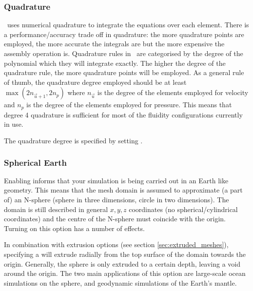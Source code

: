 \subsubsection{Quadrature}
\fluidity\ uses numerical quadrature to integrate the equations over each
element. There is a performance/accuracy trade off in quadrature: the more
quadrature points are employed, the more accurate the integrals are but
the more expensive the assembly operation is. Quadrature rules in \fluidity\ are categorised by the degree of the polynomial which they will integrate
exactly. The higher the degree of the quadrature rule, the more quadrature
points will be employed. As a general rule of thumb, the quadrature
degree employed should be at least $\max(2n_{\vec{u}+1},2n_p)$ where
$n_{\vec{u}}$ is the degree of the elements employed for velocity and $n_p$
is the degree of the elements employed for pressure. This means that degree
4 quadrature is sufficient for most of the fluidity configurations currently
in use.

The quadrature degree is specified by setting .

\subsubsection{Spherical Earth}
\label{sec:spherical_earth}

Enabling  informs \fluidity that your
simulation is being carried out in an Earth like geometry. This means that the mesh domain is assumed to approximate (a part of) an
N-sphere (sphere in three dimensions, circle in two dimensions). The domain is still described in
general $x,y,z$ coordinates (no spherical/cylindrical coordinates)
and the centre of the N-sphere must coincide with the origin.  Turning on this option has a number of effects.

In combination with extrusion options (see section \ref{sec:extruded_meshes}), 
specifying a  will extrude radially from the top surface of the
domain towards the origin.  Generally, the sphere is only extruded to a certain
depth, leaving a void around the origin. The two main applications of this
option are large-scale ocean simulations on the sphere, and geodynamic simulations of the
Earth's mantle.

